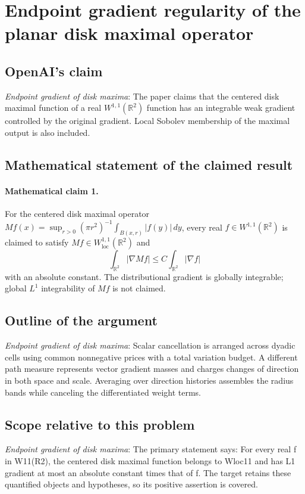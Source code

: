 \documentclass[11pt]{article}
\begin{document}
\section*{Endpoint gradient regularity of the planar disk maximal operator}

\subsection{OpenAI's claim}
\textit{Endpoint gradient of disk maxima}: The paper claims that the centered disk maximal function of a real $W^{1,1}(\mathbb R^2)$ function has an integrable weak gradient controlled by the original gradient. Local Sobolev membership of the maximal output is also included.

\subsection{Mathematical statement of the claimed result}
\paragraph{Mathematical claim 1.} For the centered disk maximal operator $Mf(x)=\sup_{r>0}(\pi r^2)^{-1}\int_{B(x,r)}|f(y)|\,dy$, every real $f\in W^{1,1}(\mathbb R^2)$ is claimed to satisfy $Mf\in W^{1,1}_{\mathrm{loc}}(\mathbb R^2)$ and \[\int_{\mathbb R^2}|\nabla Mf|\le C\int_{\mathbb R^2}|\nabla f|\] with an absolute constant. The distributional gradient is globally integrable; global $L^1$ integrability of $Mf$ is not claimed.

\subsection{Outline of the argument}
\textit{Endpoint gradient of disk maxima}: Scalar cancellation is arranged across dyadic cells using common nonnegative prices with a total variation budget. A different path measure represents vector gradient masses and charges changes of direction in both space and scale. Averaging over direction histories assembles the radius bands while canceling the differentiated weight terms.

\subsection{Scope relative to this problem}
\textit{Endpoint gradient of disk maxima}: The primary statement says: For every real f in W11(R2), the centered disk maximal function belongs to Wloc11 and has L1 gradient at most an absolute constant times that of f. The target retains these quantified objects and hypotheses, so its positive assertion is covered.
\end{document}
